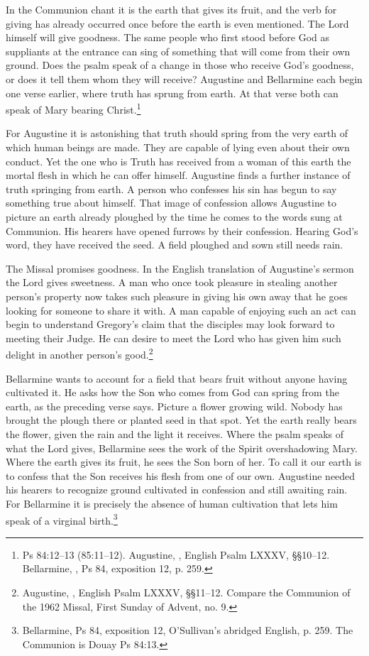 In the Communion chant it is the earth that gives its fruit, and the verb for giving has already occurred once before the earth is even mentioned. The Lord himself will give goodness. The same people who first stood before God as suppliants at the entrance can sing of something that will come from their own ground. Does the psalm speak of a change in those who receive God's goodness, or does it tell them whom they will receive? Augustine and Bellarmine each begin one verse earlier, where truth has sprung from earth. At that verse both can speak of Mary bearing Christ.\footnote{Ps 84:12--13 (85:11--12). Augustine, , English Psalm LXXXV, §§10--12. Bellarmine, , Ps 84, exposition 12, p. 259.}

For Augustine it is astonishing that truth should spring from the very earth of which human beings are made. They are capable of lying even about their own conduct. Yet the one who is Truth has received from a woman of this earth the mortal flesh in which he can offer himself. Augustine finds a further instance of truth springing from earth. A person who confesses his sin has begun to say something true about himself. That image of confession allows Augustine to picture an earth already ploughed by the time he comes to the words sung at Communion. His hearers have opened furrows by their confession. Hearing God's word, they have received the seed. A field ploughed and sown still needs rain.

The Missal promises goodness. In the English translation of Augustine's sermon the Lord gives sweetness. A man who once took pleasure in stealing another person's property now takes such pleasure in giving his own away that he goes looking for someone to share it with. A man capable of enjoying such an act can begin to understand Gregory's claim that the disciples may look forward to meeting their Judge. He can desire to meet the Lord who has given him such delight in another person's good.\footnote{Augustine, , English Psalm LXXXV, §§11--12. Compare the Communion of the 1962 Missal, First Sunday of Advent, no. 9.}

Bellarmine wants to account for a field that bears fruit without anyone having cultivated it. He asks how the Son who comes from God can spring from the earth, as the preceding verse says. Picture a flower growing wild. Nobody has brought the plough there or planted seed in that spot. Yet the earth really bears the flower, given the rain and the light it receives. Where the psalm speaks of what the Lord gives, Bellarmine sees the work of the Spirit overshadowing Mary. Where the earth gives its fruit, he sees the Son born of her. To call it our earth is to confess that the Son receives his flesh from one of our own. Augustine needed his hearers to recognize ground cultivated in confession and still awaiting rain. For Bellarmine it is precisely the absence of human cultivation that lets him speak of a virginal birth.\footnote{Bellarmine, Ps 84, exposition 12, O'Sullivan's abridged English, p. 259. The Communion is Douay Ps 84:13.}

